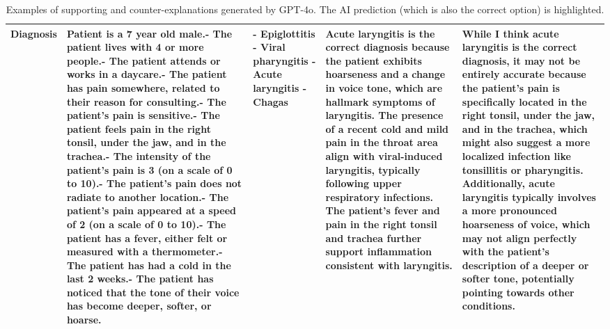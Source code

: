 \begin{table*}[ht]
\begin{tabular}{p{} p{}  p{} p{} p{}}
         Diagnosis & Patient is a 7 year old male.\newline- The patient lives with 4 or more people.\newline- The patient attends or works in a daycare.\newline- The patient has pain somewhere, related to their reason for consulting.\newline- The patient's pain is sensitive.\newline- The patient feels pain in the right tonsil, under the jaw, and in the trachea.\newline- The intensity of the patient's pain is 3 (on a scale of 0 to 10).\newline- The patient's pain does not radiate to another location.\newline- The patient's pain appeared at a speed of 2 (on a scale of 0 to 10).\newline- The patient has a fever, either felt or measured with a thermometer.\newline- The patient has had a cold in the last 2 weeks.\newline- The patient has noticed that the tone of their voice has become deeper, softer, or hoarse. &- Epiglottitis \newline - Viral pharyngitis \newline - \textbf{Acute laryngitis} \newline - Chagas & Acute laryngitis is the correct diagnosis because the patient exhibits hoarseness and a change in voice tone, which are hallmark symptoms of laryngitis. The presence of a recent cold and mild pain in the throat area align with viral-induced laryngitis, typically following upper respiratory infections. The patient's fever and pain in the right tonsil and trachea further support inflammation consistent with laryngitis. & While I think acute laryngitis is the correct diagnosis, it may not be entirely accurate because the patient's pain is specifically located in the right tonsil, under the jaw, and in the trachea, which might also suggest a more localized infection like tonsillitis or pharyngitis. Additionally, acute laryngitis typically involves a more pronounced hoarseness of voice, which may not align perfectly with the patient's description of a deeper or softer tone, potentially pointing towards other conditions. \\
         \bottomrule
    \end{tabular}
    \caption{Examples of supporting and counter-explanations generated by GPT-4o. The AI prediction (which is also the correct option) is highlighted.}
    \label{tab:sample_explanations}
\end{table*}